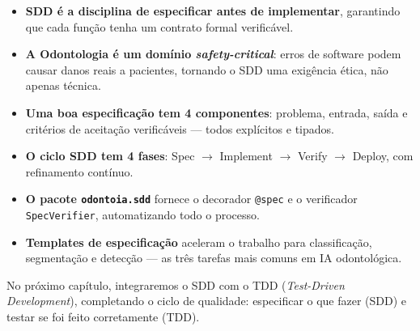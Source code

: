 \begin{itemize}
  \item \textbf{SDD é a disciplina de especificar antes de implementar},
    garantindo que cada função tenha um contrato formal verificável.

  \item \textbf{A Odontologia é um domínio \textit{safety-critical}}:
    erros de software podem causar danos reais a pacientes, tornando o
    SDD uma exigência ética, não apenas técnica.

  \item \textbf{Uma boa especificação tem 4 componentes}: problema,
    entrada, saída e critérios de aceitação verificáveis — todos
    explícitos e tipados.

  \item \textbf{O ciclo SDD tem 4 fases}: Spec $\rightarrow$ Implement
    $\rightarrow$ Verify $\rightarrow$ Deploy, com refinamento contínuo.

  \item \textbf{O pacote \texttt{odontoia.sdd}} fornece o decorador
    \texttt{@spec} e o verificador \texttt{SpecVerifier}, automatizando
    todo o processo.

  \item \textbf{Templates de especificação} aceleram o trabalho para
    classificação, segmentação e detecção — as três tarefas mais comuns
    em IA odontológica.
\end{itemize}

No próximo capítulo, integraremos o SDD com o TDD (\textit{Test-Driven
Development}), completando o ciclo de qualidade: especificar o que fazer
(SDD) e testar se foi feito corretamente (TDD).
